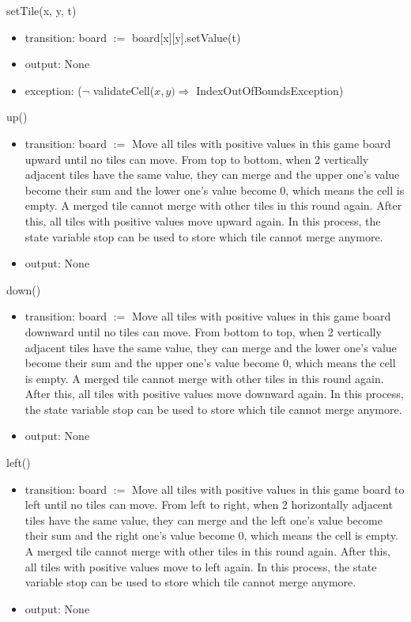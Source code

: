 \documentclass[12pt]{article}
\begin{document}
\noindent setTile(x, y, t)
\begin{itemize}
\item transition: board $:=$ board[x][y].setValue(t)
\item output: None
\item exception: ($\neg$ validateCell($x, y) \Rightarrow$ IndexOutOfBoundsException)
\end{itemize}

\noindent up()
\begin{itemize}
\item transition: board $:=$ Move all tiles with positive values in this game board upward until no tiles can move. From top to bottom, when 2 vertically adjacent tiles have the same value, they can merge and the upper one's value become their sum and the lower one's value become 0, which means the cell is empty. A merged tile cannot merge with other tiles in this round again. After this, all tiles with positive values move upward again. In this process, the state variable stop can be used to store which tile cannot merge anymore.
\item output: None
\end{itemize}

\noindent down()
\begin{itemize}
\item transition: board $:=$ Move all tiles with positive values in this game board downward until no tiles can move. From bottom to top, when 2 vertically adjacent tiles have the same value, they can merge and the lower one's value become their sum and the upper one's value become 0, which means the cell is empty. A merged tile cannot merge with other tiles in this round again. After this, all tiles with positive values move downward again. In this process, the state variable stop can be used to store which tile cannot merge anymore.
\item output: None
\end{itemize}

\noindent left()
\begin{itemize}
\item transition: board $:=$ Move all tiles with positive values in this game board to left until no tiles can move. From left to right, when 2 horizontally adjacent tiles have the same value, they can merge and the left one's value become their sum and the right one's value become 0, which means the cell is empty. A merged tile cannot merge with other tiles in this round again. After this, all tiles with positive values move to left again. In this process, the state variable stop can be used to store which tile cannot merge anymore.
\item output: None
\end{itemize}
\end{document}

